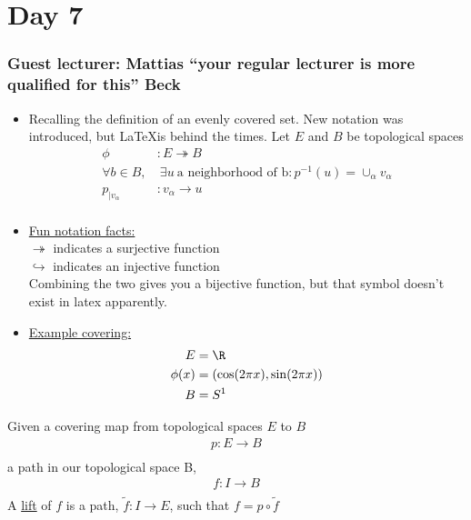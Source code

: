 \section{Day 7}
    \subsubsection{Guest lecturer: Mattias ``your regular lecturer is more qualified for this'' Beck}
    \begin{itemize}
        \item Recalling the definition of an evenly covered set. New notation was introduced, but
            \LaTeX is behind the times.
            Let $E$ and $B$ be topological spaces
            \begin{align*}
                \phi&:E \twoheadrightarrow B\\
                \forall b \in B,&\ \exists u\ \text{a neighborhood of b}: p^{-1}(u)=\cup_{\alpha}v_\alpha\\
                p_{|v_{\alpha}}&: v_{\alpha}\rightarrow u\\
            \end{align*}
        \item \underline{Fun notation facts:}\\
            $\twoheadrightarrow$ indicates a surjective function\\
            $\hookrightarrow$ indicates an injective function\\
            Combining the two gives you a bijective function, but that symbol doesn't exist
            in latex apparently.
        \item \underline{Example covering:}
            \begin{align*}
                E&=\R\\
                \phi(x)&=(\cos(2\pi x), \sin(2\pi x))\\
                B&=S^{1}\\
            \end{align*}
    \end{itemize}
            \begin{definition} Given a covering map from topological
                spaces $E$ to $B$
                \begin{align*}
                    p: E\rightarrow B\\
                \end{align*}
                    a path in our topological space B,
                \begin{align*}
                    f: I \rightarrow B\\
                \end{align*}
                A \underline{lift} of $f$ is a path, $\tilde{f}: I\rightarrow E$, such that
                $f=p\circ \tilde{f}$
            \end{definition}
